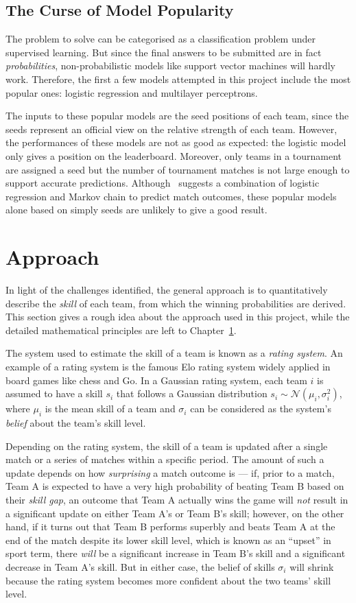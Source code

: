 \subsection{The Curse of Model Popularity}
The problem to solve can be categorised as a classification problem under supervised learning. But since the final answers to be submitted are in fact \emph{probabilities}, non-probabilistic models like support vector machines will hardly work. Therefore, the first a few models attempted in this project include the most popular ones: logistic regression and multilayer perceptrons. 

The inputs to these popular models are the seed positions of each team, since the seeds represent an official view on the relative strength of each team. However, the performances of these models are not as good as expected: the logistic model only gives a  position on the leaderboard. Moreover, only teams in a tournament are assigned a seed but the number of tournament matches is not large enough to support accurate predictions. Although~\cite{PJ06} suggests a combination of logistic regression and Markov chain to predict match outcomes, these popular models alone based on simply seeds are unlikely to give a good result. 

\section{Approach}
In light of the challenges identified, the general approach is to quantitatively describe the \emph{skill} of each team, from which the winning probabilities are derived. This section gives a rough idea about the approach used in this project, while the detailed mathematical principles are left to Chapter~\ref{}. 

The system used to estimate the skill of a team is known as a \emph{rating system}. An example of a rating system is the famous Elo rating system widely applied in board games like chess and Go. In a Gaussian rating system, each team $i$ is assumed to have a skill $s_{i}$ that follows a Gaussian distribution $s_{i} \sim \mathcal{N}(\mu_{i}, \sigma_{i}^{2})$, where $\mu_{i}$ is the mean skill of a team and $\sigma_{i}$ can be considered as the system's \emph{belief} about the team's skill level. 

Depending on the rating system, the skill of a team is updated after a single match or a series of matches within a specific period. The amount of such a update depends on how \emph{surprising} a match outcome is --- if, prior to a match, Team A is expected to have a very high probability of beating Team B based on their \emph{skill gap}, an outcome that Team A actually wins the game will \emph{not} result in a significant update on either Team A's or Team B's skill; however, on the other hand, if it turns out that Team B performs superbly and beats Team A at the end of the match despite its lower skill level, which is known as an ``upset'' in sport term, there \emph{will} be a significant increase in Team B's skill and a significant decrease in Team A's skill. But in either case, the belief of skills $\sigma_{i}$ will shrink because the rating system becomes more confident about the two teams' skill level. 

